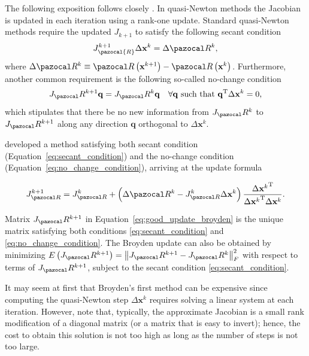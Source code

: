 The following exposition follows closely \cite{fang_two_2009}.
In quasi-Newton methods the Jacobian is updated in each iteration using a rank-one update.
Standard quasi-Newton methods require the updated \(J_{k+1}\) to satisfy the following secant condition
\begin{equation} \label{eq:secant_condition}
J_\pazocal{R}^{k+1} \Delta \mathbf x^{k}=\Delta \pazocal R^{k},
\end{equation}
where \(\Delta \pazocal R^{k}\equiv \pazocal R\left(\mathbf x^{k+1}\right)-\pazocal R\left(\mathbf x^ {k}\right)\).
Furthermore, another common requirement is the following so-called no-change condition
\begin{equation} \label{eq:no_change_condition}
J_\pazocal R^{k+1} \mathbf q=J_\pazocal R^{k} \mathbf q \quad \forall \mathbf q \text { such that } \mathbf q^{\mathrm{T}} \Delta \mathbf x^{k}=0,
\end{equation}
which stipulates that there be no new information from \(J_\pazocal R^{k}\) to \(J_\pazocal R^{k+1}\) along any direction \(\mathbf q\) orthogonal to \(\Delta \mathbf x^{k}\).

\cite{broyden_class_1965} developed a method satisfying both secant condition (Equation~\eqref{eq:secant_condition}) and the no-change condition (Equation~\eqref{eq:no_change_condition}), arriving at the update formula
\begin{highlight}
\begin{equation} \label{eq:good_update_broyden}
J_{\pazocal R}^{k+1}=J_{\pazocal R}^{k}+\left(\Delta \pazocal R^{k}-J_{\pazocal R}^{k} \Delta \mathbf x^{k}\right) \frac{\Delta {\mathbf x^{k}}^{\mathrm{T}}}{\Delta {\mathbf x^{k}}^{\mathrm{T}} \Delta \mathbf x^{k}}.
\end{equation}
\end{highlight}

Matrix \(J_\pazocal R^{k+1}\) in Equation~\eqref{eq:good_update_broyden} is the unique matrix satisfying both conditions \eqref{eq:secant_condition} and \eqref{eq:no_change_condition}.
The Broyden update can also be obtained by minimizing \(E\left(J_\pazocal R^{k+1}\right)=\left\|J_\pazocal R^{k+1}-J_\pazocal R^{k}\right\|_{F}^{2}\) with respect to terms of \(J_\pazocal R^{k+1}\), subject to the secant condition \eqref{eq:secant_condition}.

It may seem at first that Broyden's first method can be expensive since computing the quasi-Newton step \(\Delta \mathbf x^{k}\) requires solving a linear system at each iteration.
However, note that, typically, the approximate Jacobian is a small rank modification of a diagonal matrix (or a matrix that is easy to invert); hence, the cost to obtain this solution is not too high as long as the number of steps is not too large.

